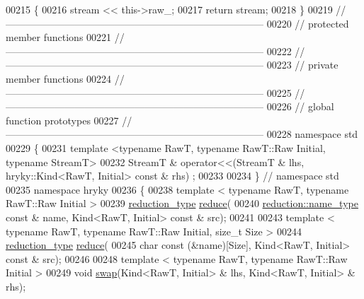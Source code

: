\begin{DoxyCode}
00215 \textcolor{keyword}{}\{
00216     stream << this->raw\_;
00217     \textcolor{keywordflow}{return} stream;
00218 \}
00219 \textcolor{comment}{//
      ------------------------------------------------------------------------------}
00220 \textcolor{comment}{// protected member functions}
00221 \textcolor{comment}{//
      ------------------------------------------------------------------------------}
00222 \textcolor{comment}{//
      ------------------------------------------------------------------------------}
00223 \textcolor{comment}{// private member functions}
00224 \textcolor{comment}{//
      ------------------------------------------------------------------------------}
00225 \textcolor{comment}{//
      ------------------------------------------------------------------------------}
00226 \textcolor{comment}{// global function prototypes}
00227 \textcolor{comment}{//
      ------------------------------------------------------------------------------}
00228 \textcolor{keyword}{namespace }std
00229 \{
00231     \textcolor{keyword}{template} <\textcolor{keyword}{typename} RawT, \textcolor{keyword}{typename} RawT::Raw Initial, \textcolor{keyword}{typename} StreamT>
00232     StreamT & operator<<(StreamT & lhs, hryky::Kind<RawT, Initial> \textcolor{keyword}{const} & rhs)
      ;
00233 
00234 \} \textcolor{comment}{// namespace std}
00235 \textcolor{keyword}{namespace }hryky
00236 \{
00238     \textcolor{keyword}{template} < \textcolor{keyword}{typename} RawT, \textcolor{keyword}{typename} RawT::Raw Initial >
00239     \hyperlink{namespacehryky_a343a9a4c36a586be5c2693156200eadc}{reduction_type} \hyperlink{namespacehryky_af41cb3af6766761da0ff21b84527a52c}{reduce}(
00240         \hyperlink{namespacehryky_1_1reduction_ac686c30a4c8d196bbd0f05629a6b921f}{reduction::name_type} \textcolor{keyword}{const} & name, Kind<RawT, Initial> \textcolor{keyword}{const} & src);
00241 
00243     \textcolor{keyword}{template} < \textcolor{keyword}{typename} RawT, \textcolor{keyword}{typename} RawT::Raw Initial, \textcolor{keywordtype}{size\_t} Size >
00244     \hyperlink{namespacehryky_a343a9a4c36a586be5c2693156200eadc}{reduction_type} \hyperlink{namespacehryky_af41cb3af6766761da0ff21b84527a52c}{reduce}(
00245         \textcolor{keywordtype}{char} \textcolor{keyword}{const} (&name)[Size], Kind<RawT, Initial> \textcolor{keyword}{const} & src);
00246 
00248     \textcolor{keyword}{template} < \textcolor{keyword}{typename} RawT, \textcolor{keyword}{typename} RawT::Raw Initial >
00249     \textcolor{keywordtype}{void} \hyperlink{namespacehryky_a4282146df5ea2b68cb667896a2205909}{swap}(Kind<RawT, Initial> & lhs, Kind<RawT, Initial> & rhs);

\end{DoxyCode}
